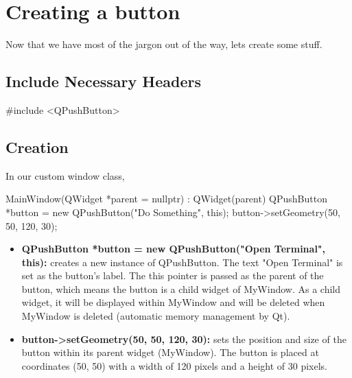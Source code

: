 \documentclass{report}
\begin{document}
    \pagebreak 
    \section*{Creating a button}
    \bigbreak \noindent 
    Now that we have most of the jargon out of the way, lets create some stuff.
    \bigbreak \noindent 
    \subsection*{Include Necessary Headers}
    \bigbreak \noindent 
    \begin{cppcode}
    #include <QPushButton>
    \end{cppcode}
    \bigbreak \noindent 
    \subsection*{Creation}
    \bigbreak \noindent 
    In our custom window class, 
    \bigbreak \noindent 
    \begin{cppcode}
    MainWindow(QWidget *parent = nullptr) : QWidget(parent) {
        QPushButton *button = new QPushButton("Do Something", this);
        button->setGeometry(50, 50, 120, 30);
    }
    \end{cppcode}
    \begin{itemize}
        \item \textbf{QPushButton *button = new QPushButton("Open Terminal", this):} creates a new instance of QPushButton. The text "Open Terminal" is set as the button's label. The this pointer is passed as the parent of the button, which means the button is a child widget of MyWindow. As a child widget, it will be displayed within MyWindow and will be deleted when MyWindow is deleted (automatic memory management by Qt).
        \item \textbf{button->setGeometry(50, 50, 120, 30):} sets the position and size of the button within its parent widget (MyWindow). The button is placed at coordinates (50, 50) with a width of 120 pixels and a height of 30 pixels.
    \end{itemize}
    
    \bigbreak \noindent 
\end{document}

